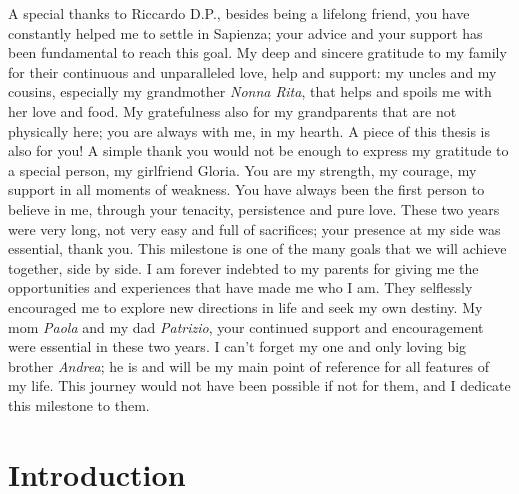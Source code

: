 \documentclass[english, LaM, oneside]{sapthesis}%
\begin{document}
\begin{acknowledgments}
\newline
A special thanks to Riccardo D.P., besides being a lifelong friend, you have constantly helped me to settle in Sapienza; your advice and your support has been fundamental to reach this goal.
\newline \newline
My deep and sincere gratitude to my family for their continuous and unparalleled love, help and support: my uncles and my cousins, especially my grandmother \textit{Nonna Rita}, that helps and spoils me with her love and food.  My gratefulness also for my grandparents that are not physically here; you are always with me, in my hearth. A piece of this thesis is also for you!
\newline \newline
A simple thank you would not be enough to express my gratitude to a special person, my girlfriend Gloria. You are my strength, my  courage, my support in all moments of weakness. You have always been the first person to believe in me, through your tenacity, persistence and pure love. These two years were very long, not very easy and full of sacrifices; your presence at my side was essential, thank you.  
This milestone is one of the many goals that we will achieve together, side by side. 
\newline \newline
I am forever indebted to my parents for giving me the opportunities and experiences that have made me who I am. They selflessly encouraged me to explore new directions in life and seek my own destiny. My mom \textit{Paola} and my dad \textit{Patrizio}, your continued support and encouragement were essential in these two years. I can't forget my one and only loving big brother \textit{Andrea}; he is and will be my main point of reference for all features of my life.  
This journey would not have been possible if not for them, and I dedicate this milestone to them. 

\end{acknowledgments}
\clearpage\null
\tableofcontents

\mainmatter


\chapter{Introduction}
\end{document}
